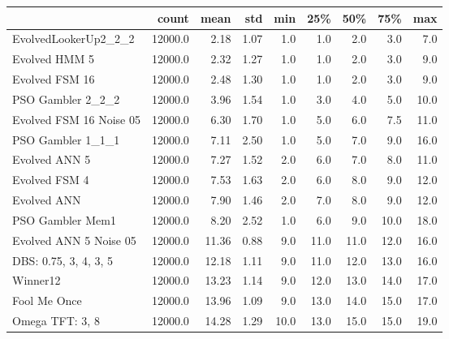 \begin{tabular}{lrrrrrrrr}
\toprule
{} &    count &   mean &   std &   min &   25\% &   50\% &   75\% &   max \\
\midrule
EvolvedLookerUp2\_2\_2    &  12000.0 &   2.18 &  1.07 &   1.0 &   1.0 &   2.0 &   3.0 &   7.0 \\
Evolved HMM 5           &  12000.0 &   2.32 &  1.27 &   1.0 &   1.0 &   2.0 &   3.0 &   9.0 \\
Evolved FSM 16          &  12000.0 &   2.48 &  1.30 &   1.0 &   1.0 &   2.0 &   3.0 &   9.0 \\
PSO Gambler 2\_2\_2       &  12000.0 &   3.96 &  1.54 &   1.0 &   3.0 &   4.0 &   5.0 &  10.0 \\
Evolved FSM 16 Noise 05 &  12000.0 &   6.30 &  1.70 &   1.0 &   5.0 &   6.0 &   7.5 &  11.0 \\
PSO Gambler 1\_1\_1       &  12000.0 &   7.11 &  2.50 &   1.0 &   5.0 &   7.0 &   9.0 &  16.0 \\
Evolved ANN 5           &  12000.0 &   7.27 &  1.52 &   2.0 &   6.0 &   7.0 &   8.0 &  11.0 \\
Evolved FSM 4           &  12000.0 &   7.53 &  1.63 &   2.0 &   6.0 &   8.0 &   9.0 &  12.0 \\
Evolved ANN             &  12000.0 &   7.90 &  1.46 &   2.0 &   7.0 &   8.0 &   9.0 &  12.0 \\
PSO Gambler Mem1        &  12000.0 &   8.20 &  2.52 &   1.0 &   6.0 &   9.0 &  10.0 &  18.0 \\
Evolved ANN 5 Noise 05  &  12000.0 &  11.36 &  0.88 &   9.0 &  11.0 &  11.0 &  12.0 &  16.0 \\
DBS: 0.75, 3, 4, 3, 5   &  12000.0 &  12.18 &  1.11 &   9.0 &  11.0 &  12.0 &  13.0 &  16.0 \\
Winner12                &  12000.0 &  13.23 &  1.14 &   9.0 &  12.0 &  13.0 &  14.0 &  17.0 \\
Fool Me Once            &  12000.0 &  13.96 &  1.09 &   9.0 &  13.0 &  14.0 &  15.0 &  17.0 \\
Omega TFT: 3, 8         &  12000.0 &  14.28 &  1.29 &  10.0 &  13.0 &  15.0 &  15.0 &  19.0 \\
\bottomrule
\end{tabular}
